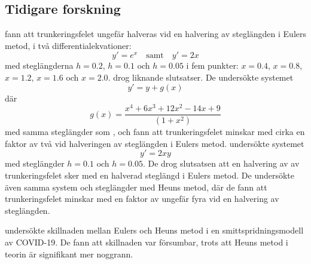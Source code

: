 \subsection{Tidigare forskning}
\textcite[344-345]{atkinson_introduction_1989} fann att trunkeringsfelet ungefär halveras vid en halvering av steglängden i Eulers metod, i två differentialekvationer:
\begin{equation*}
    y'=e^x\quad\mathrm{samt}\quad y'=2x
\end{equation*} med steglängderna \(h=0.2\), \(h=0.1\) och \(h=0.05\) i fem punkter: \(x=0.4\), \(x=0.8\), \(x=1.2\), \(x=1.6\) och \(x=2.0\). \textcite[320-321]{suli_introduction_2003} drog liknande slutsatser. De undersökte systemet
\begin{equation*}
    y'=y+g(x)
\end{equation*} där
\begin{equation*}
    g(x)=\frac{x^4+6x^3+12x^2-14x+9}{(1+x^2)}
\end{equation*} med samma steglängder som \citeauthor{atkinson_introduction_1989}, och fann att trunkeringsfelet minskar med cirka en faktor av två vid halveringen av steglängden i Eulers metod. \textcite[371]{zill_differential_2005} undersökte systemet
\begin{equation*}
    y'=2xy
\end{equation*} med steglängder \(h=0.1\) och \(h=0.05\). De drog slutsatsen att en halvering av av trunkeringsfelet sker med en halverad steglängd i Eulers metod. De undersökte även samma system och steglängder med Heuns metod, där de fann att trunkeringsfelet minskar med en faktor av ungefär fyra vid en halvering av steglängden.

\textcite{pratiwi_eulers_2021} undersökte skillnaden mellan Eulers och Heuns metod i en smittspridningsmodell av COVID-19. De fann att skillnaden var försumbar, trots att Heuns metod i teorin är signifikant mer noggrann.
